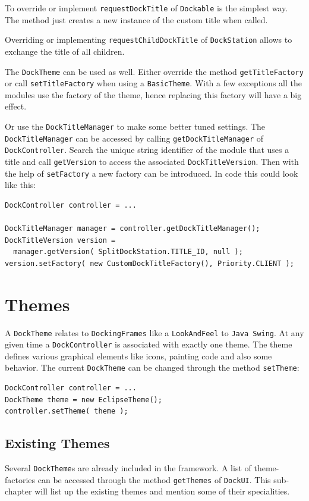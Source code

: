 \documentclass[a4paper,10pt]{article}
\newcommand{\src}[1]{\texttt{#1}}
\begin{document}
To override or implement \src{requestDockTitle} of \src{Dockable} is the simplest way. The method just creates a new instance of the custom title when called.

Overriding or implementing \src{requestChildDockTitle} of \src{DockStation} allows to exchange the title of all children.

The \src{DockTheme} can be used as well. Either override the method \linebreak \src{getTitleFactory} or call \src{setTitleFactory} when using a \src{BasicTheme}. With a few exceptions all the modules use the factory of the theme, hence replacing this factory will have a big effect.

Or use the \src{DockTitleManager} to make some better tuned settings. The \linebreak \src{DockTitleManager} can be accessed by calling \src{getDockTitleManager} of \linebreak \src{DockController}. Search the unique string identifier of the module that uses a title and call \src{getVersion} to access the associated \src{DockTitleVersion}. Then with the help of \src{setFactory} a new factory can be introduced. In code this could look like this:
\begin{lstlisting}
DockController controller = ...

DockTitleManager manager = controller.getDockTitleManager();
DockTitleVersion version =
  manager.getVersion( SplitDockStation.TITLE_ID, null );
version.setFactory( new CustomDockTitleFactory(), Priority.CLIENT );
\end{lstlisting}

\section{Themes}
A \src{DockTheme} relates to \src{DockingFrames} like a \src{LookAndFeel} to \src{Java Swing}. At any given time a \src{DockController} is associated with exactly one theme. The theme defines various graphical elements like icons, painting code and also some behavior. The current \src{DockTheme} can be changed through the method \src{setTheme}:
\begin{lstlisting}
DockController controller = ...
DockTheme theme = new EclipseTheme();
controller.setTheme( theme );
\end{lstlisting}

\subsection{Existing Themes}
Several \src{DockTheme}s are already included in the framework. A list of theme-factories can be accessed through the method \src{getThemes} of \src{DockUI}. This sub-chapter will list up the existing themes and mention some of their specialities.
\end{document}

